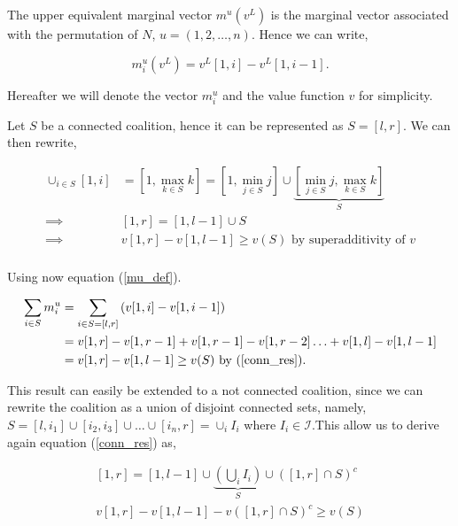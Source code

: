 \documentclass[american]{scrartcl}
\begin{document}
The upper equivalent marginal vector $m^u(v^L)$ is the marginal vector associated with the permutation of $N$, $u = (1, 2, \ldots, n)$. Hence we can write,

\begin{equation} \label{mu_def}
    m^u_i(v^L) = v^L[1, i] - v^L[1, i-1].
\end{equation}

Hereafter we will denote the vector $m^u_i$ and the value function $v$ for simplicity.

Let $S$ be a connected coalition, hence it can be represented as $S=[l, r]$. We can then rewrite,

\begin{equation} \label{conn_res}
    \begin{split}
        \cup_{i \in S} [1, i] &= [1, \max_{k \in S} k] = [1, \min_{j \in S}j] \cup \underbrace{[\min_{j \in S}j, \max_{k \in S}k]}_{S}\\
        \implies & [1, r] = [1, l - 1] \cup S \\
        \implies & v[1, r] - v[1, l - 1]  \geq  v(S) \text{ by superadditivity of } v \\
    \end{split}
\end{equation}

Using now equation (\ref{mu_def}).

\begin{equation} \label{incore}
    \begin{split}
        \sum_{i \in S} m^u_i &= \sum_{i \in S = [l, r]} \left(v[1, i] - v[1, i-1]\right) \\
        &= v[1, r] - v[1, r - 1] + v[1, r -1] - v[1,  r - 2] \ldots + v[1, l] - v[1, l-1] \\
        &= v[1, r] - v[1, l - 1] \geq v(S) \text{ by (\ref{conn_res}).}
    \end{split}
\end{equation}

This result can easily be extended to a not connected coalition, since we can rewrite the coalition as a union of disjoint connected sets, namely, $S = [l, i_1] \cup [i_2, i_3] \cup \dots \cup [i_n, r] = \cup_i I_i$ where $I_i \in \mathcal{I}$.This allow us to derive again equation (\ref{conn_res}) as,

\begin{equation}
    \begin{split}
        [1, r] = [1, l - 1] \cup \underbrace{\left(\bigcup_i I_i\right)}_{S} \cup \left([1, r] \cap S\right)^c \\
        v[1, r] - v[1, l - 1] - v\left([1, r] \cap S\right)^c \geq v(S)
    \end{split}
\end{equation}
\end{document}
